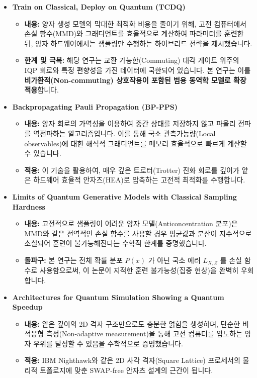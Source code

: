 \documentclass[11pt,a4paper]{article}
\begin{document}
\begin{itemize}
    \item \textbf{Train on Classical, Deploy on Quantum (TCDQ)}
    \begin{itemize}[label=--]
        \item \textbf{내용:} 양자 생성 모델의 막대한 최적화 비용을 줄이기 위해, 고전 컴퓨터에서 손실 함수(MMD)와 그래디언트를 효율적으로 계산하여 파라미터를 훈련한 뒤, 양자 하드웨어에서는 샘플링만 수행하는 하이브리드 전략을 제시했습니다.
        \item \textbf{한계 및 극복:} 해당 연구는 교환 가능한(Commuting) 대각 게이트 위주의 IQP 회로와 특정 편향성을 가진 데이터에 국한되어 있습니다. 본 연구는 이를 \textbf{비가환적(Non-commuting) 상호작용이 포함된 범용 동역학 모델로 확장 적용}합니다.
    \end{itemize}

    \item \textbf{Backpropagating Pauli Propagation (BP-PPS)}
    \begin{itemize}[label=--]
        \item \textbf{내용:} 양자 회로의 가역성을 이용하여 중간 상태를 저장하지 않고 파울리 전파를 역전파하는 알고리즘입니다. 이를 통해 국소 관측가능량(Local observables)에 대한 해석적 그래디언트를 메모리 효율적으로 빠르게 계산할 수 있습니다.
        \item \textbf{적용:} 이 기술을 활용하여, 매우 깊은 트로터(Trotter) 진화 회로를 깊이가 얕은 하드웨어 효율적 안자츠(HEA)로 압축하는 고전적 최적화를 수행합니다.
    \end{itemize}

    \item \textbf{Limits of Quantum Generative Models with Classical Sampling Hardness}
    \begin{itemize}[label=--]
        \item \textbf{내용:} 고전적으로 샘플링이 어려운 양자 모델(Anticoncentration 분포)은 MMD와 같은 전역적인 손실 함수를 사용할 경우 평균값과 분산이 지수적으로 소실되어 훈련이 불가능해진다는 수학적 한계를 증명했습니다.
        \item \textbf{돌파구:} 본 연구는 전체 확률 분포 $P(x)$ 가 아닌 국소 에러 $L_{X,Z}$ 를 손실 함수로 사용함으로써, 이 논문이 지적한 훈련 불가능성(집중 현상)을 완벽히 우회합니다.
    \end{itemize}

    \item \textbf{Architectures for Quantum Simulation Showing a Quantum Speedup}
    \begin{itemize}[label=--]
        \item \textbf{내용:} 얕은 깊이의 2D 격자 구조만으로도 충분한 얽힘을 생성하며, 단순한 비적응형 측정(Non-adaptive measurement)을 통해 고전 컴퓨터를 압도하는 양자 우위를 달성할 수 있음을 수학적으로 증명했습니다.
        \item \textbf{적용:} IBM Nighthawk와 같은 2D 사각 격자(Square Lattice) 프로세서의 물리적 토폴로지에 맞춘 SWAP-free 안자츠 설계의 근간이 됩니다.
    \end{itemize}
\end{itemize}
\end{document}

